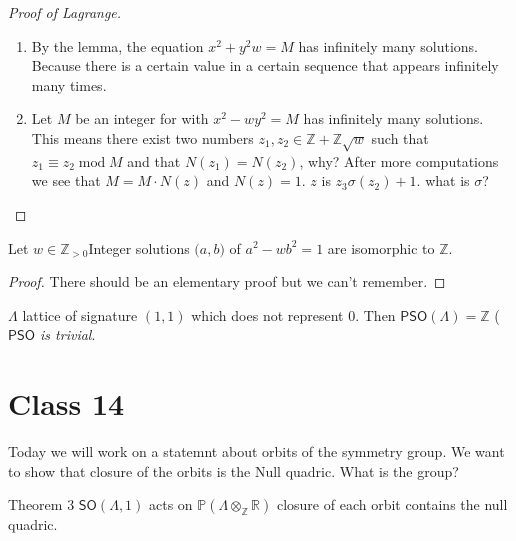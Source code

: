 \begin{proof}[Proof of Lagrange]\leavevmode
	\begin{enumerate}[label=\textbf{Step \arabic*}]
		\item By the lemma, the equation $x^2+y^2w=M$ has infinitely many solutions. Because there is a certain value in a certain sequence that appears infinitely many times.

		\item Let $M$ be an integer for with  $x^2-wy^2=M$ has infinitely many solutions.  This means there exist two numbers $z_1,z_2\in\mathbb{Z}+\mathbb{Z}\sqrt{w} $ such that $z_1\equiv z_2\operatorname{mod}M$ and that $N(z_1)=N(z_2)$, {\color{6}why?} After more computations we see that $M=M\cdot N(z)$ and $N(z)=1$.  $z$ is  $z_3\sigma(z_2)+1$. {\color{7}what is $\sigma$?}
	\end{enumerate}
\end{proof}




\begin{thm}\leavevmode
	Let $w\in\mathbb{Z}_{> 0}$Integer solutions $\big(a,b\big)$ of $a^2-wb^2=1$ are isomorphic to $\mathbb{Z}$.
\end{thm}

\begin{proof}\leavevmode
	There should be an elementary proof but we can't remember.
\end{proof}

\begin{thm}\leavevmode
	$\Lambda$ lattice of signature $(1,1)$ which does not represent 0. Then  $\mathsf{PSO}(\Lambda)=\mathbb{Z}$ (\textit{$\mathsf{PSO}$ is trivial}.
\end{thm}


\section{Class 14}

Today we will work on a statemnt about orbits of the symmetry group. We want to show that closure of the orbits is the Null quadric. {\color{4}What is the group?}

\begin{idea4}{Theorem 3}\leavevmode
	$\mathsf{SO}(\Lambda,1)$ acts on $\mathbb{P}(\Lambda\otimes_\mathbb{Z}\mathbb{R})$ closure of each orbit contains the null quadric.
\end{idea4}

